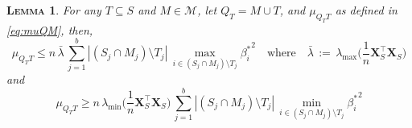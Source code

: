 \documentclass[
  12pt]{article}
\newcommand{\M}{\mathcal{M}}
\newcommand{\bX}{\mathbf{X}}
\newtheorem{lem}[thm]{\textsc{Lemma}}
\begin{document}
\begin{lem}\label{lem:upperboundnoncentralgen}
    For any $T\subseteq S$ and $M\in \M$, let $Q_T=M\cup T$, and $\mu_{Q_T T}$ as defined in \eqref{eq:muQM}, then, 
    \begin{equation}\label{eq:upperbounnnnnd}
      \mu_{Q_TT} \leq n\,\bar{\lambda}\,\sum_{j=1}^b|(S_j\cap M_j )\setminus T_j|\,\max_{i\in (S_j\cap M_j )\setminus T_j}{\beta_{i}^*}^2 \quad \text{where}\quad \bar{\lambda}\,:=\,\lambda_{\max}\Big(\frac1n \bX_{S}^\top\bX_{S}\Big)  
    \end{equation}
    and
    \begin{equation}\label{eq:lowerbounnnnnd}
    \mu_{Q_TT} \geq n\,\lambda_{\min}\Big(\frac1n \bX_{S}^\top\bX_{S}\Big)\,\sum_{j=1}^b|(S_j\cap M_j )\setminus T_j|\,\min_{i\in (S_j\cap M_j )\setminus T_j}{\beta_{i}^*}^2
    \end{equation}
\end{lem}
\end{document}
